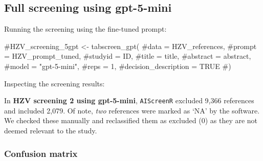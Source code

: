 \documentclass[
  letterpaper,
  DIV=11,
  numbers=noendperiod]{scrartcl}
\newenvironment{Shaded}{\begin{snugshade}}{\end{snugshade}}
\newcommand{\CommentTok}[1]{\textcolor[rgb]{0.37,0.37,0.37}{#1}}
\newcommand{\FunctionTok}[1]{\textcolor[rgb]{0.28,0.35,0.67}{#1}}
\newcommand{\NormalTok}[1]{\textcolor[rgb]{0.00,0.23,0.31}{#1}}
\newcommand{\OtherTok}[1]{\textcolor[rgb]{0.00,0.23,0.31}{#1}}
\newcommand{\SpecialCharTok}[1]{\textcolor[rgb]{0.37,0.37,0.37}{#1}}
\newcommand{\StringTok}[1]{\textcolor[rgb]{0.13,0.47,0.30}{#1}}
\begin{document}
\subsection{Full screening using
gpt-5-mini}\label{full-screening-using-gpt-5-mini}

Running the screening using the fine-tuned prompt:

\begin{Shaded}
\begin{Highlighting}[]
\CommentTok{\#HZV\_screening\_5gpt \textless{}{-} tabscreen\_gpt(}
  \CommentTok{\#data = HZV\_references,}
  \CommentTok{\#prompt = HZV\_prompt\_tuned,}
  \CommentTok{\#studyid = ID,}
  \CommentTok{\#title = title,}
  \CommentTok{\#abstract = abstract,}
  \CommentTok{\#model = "gpt{-}5{-}mini",}
  \CommentTok{\#reps = 1,}
  \CommentTok{\#decision\_description = TRUE}
\CommentTok{\#)}
\end{Highlighting}
\end{Shaded}

Inspecting the screening results:

\begin{Shaded}
\end{Shaded}

In \textbf{HZV screening 2 using gpt-5-mini}, \texttt{AIScreenR}
excluded 9,366 references and included 2,079. Of note, \emph{two}
references were marked as `NA' by the software. We checked these
manually and reclassified them as excluded (0) as they are not deemed
relevant to the study.\\

\subsubsection{Confusion matrix}\label{confusion-matrix-2}
\end{document}
